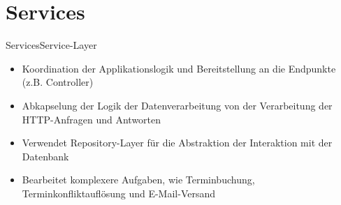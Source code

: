 \documentclass{sdqbeamer}
\begin{document}
\section{Services}
\begin{frame}{Services}{Service-Layer}
    \begin{itemize}
        \item Koordination der Applikationslogik und Bereitstellung an die Endpunkte (z.B. Controller)
        \item Abkapselung der Logik der Datenverarbeitung von der Verarbeitung der HTTP-Anfragen und Antworten
        \item Verwendet Repository-Layer für die Abstraktion der Interaktion mit der Datenbank
        \item Bearbeitet komplexere Aufgaben, wie Terminbuchung, Terminkonfliktauflösung und E-Mail-Versand
    \end{itemize}
\end{frame}
\end{document}
